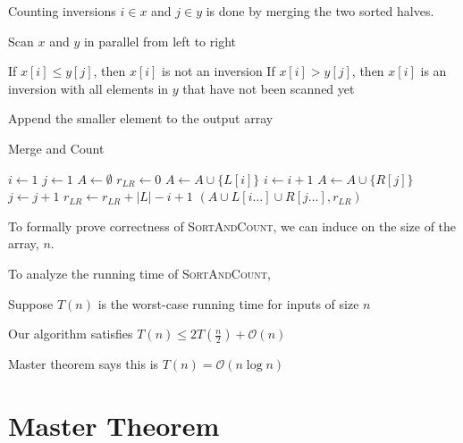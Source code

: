 Counting inversions $i \in x$ and $j \in y$ is done by merging the two sorted halves.

\begin{listu}
    \item Scan $x$ and $y$ in parallel from left to right
    \item If $x[i] \le y[j]$, then $x[i]$ is not an inversion
    If $x[i] > y[j]$, then $x[i]$ is an inversion with all elements in $y$ that have not been scanned yet
    \item Append the smaller element to the output array
\end{listu}

\newpage
\begin{algorithm}
    \caption{Merge and Count}

    \begin{algorithmic}[1]
            \State $i \gets 1$
            \State $j \gets 1$
            \State $A \gets \emptyset$
            \State $r_{LR} \gets 0$
                    \State $A \gets A \cup \{L[i]\}$
                    \State $i \gets i + 1$
                \Else
                    \State $A \gets A \cup \{R[j]\}$
                    \State $j \gets j + 1$
                    \State $r_{LR} \gets r_{LR} + |L| - i + 1$
                \EndIf
            \EndWhile
            \State \Return $(A \cup L[i \dots] \cup R[j \dots], r_{LR})$
        \EndFunction
    \end{algorithmic}
\end{algorithm}

To formally prove correctness of \textsc{SortAndCount}, we can induce on the size of the array, $n$. 

To analyze the running time of \textsc{SortAndCount}, 

\begin{listu}
    \item Suppose $T(n)$ is the worst-case running time for inputs of size $n$
    \item Our algorithm satisfies $T(n) \le 2T(\frac{n}{2}) + \mathcal{O}(n)$
    \item Master theorem says this is $T(n) = \mathcal{O}(n \log n)$
\end{listu}

\section{Master Theorem}

